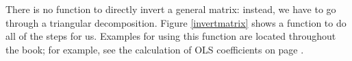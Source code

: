 There is no function to directly invert a general matrix: instead, we have to go through a triangular
decomposition. Figure \ref{invertmatrix} shows a function to do all of the steps for us.
Examples for using this function are located throughout the book; for example, see the calculation of
OLS coefficients on page \pageref{ols}. 
